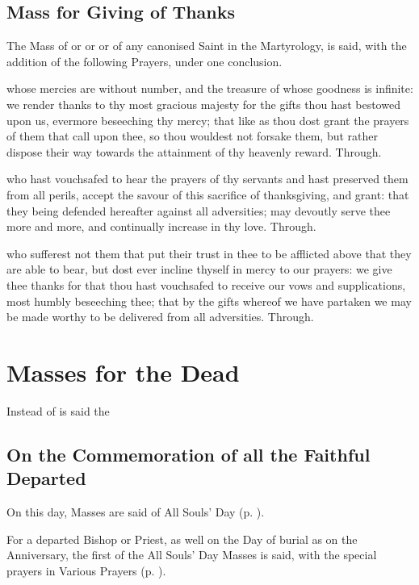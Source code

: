 \clearpage
\subsection{Mass for Giving of Thanks}

\begin{rubric}
	The Mass of  or  or  or of any canonised Saint in the Martyrology, is said, with the addition of the following Prayers, under one conclusion.
\end{rubric}

\collect
{} whose mercies are without number, and the treasure of whose goodness is infinite: we render thanks to thy most gracious majesty for the gifts thou hast bestowed upon us, evermore beseeching thy mercy; that like as thou dost grant the prayers of them that call upon thee, so thou wouldest not forsake them, but rather dispose their way towards the attainment of thy heavenly reward. Through.

\secret
{} who hast vouchsafed to hear the prayers of thy servants and hast preserved them from all perils, accept the savour of this sacrifice of thanksgiving, and grant: that they being defended hereafter against all adversities; may devoutly serve thee more and more, and continually increase in thy love. Through.

\postcommunion
{} who sufferest not them that put their trust in thee to be afflicted above that they are able to bear, but dost ever incline thyself in mercy to our prayers: we give thee thanks for that thou hast vouchsafed to receive our vows and supplications, most humbly beseeching thee; that by the gifts whereof we have partaken we may be made worthy to be delivered from all adversities. Through.


\clearpage
\section{Masses for the Dead}\label{RequiemMasses}
\fancyhead[RE,LO]{}
\begin{secrubric}
    Instead of  is said the 
\end{secrubric}
\vspace{-2ex}
\subsection{On the Commemoration of all the Faithful Departed}
\begin{rubric}
    On this day, Masses are said of All Souls' Day (p. \pageref{AllSouls}).
\end{rubric}
\begin{rubric}
    For a departed Bishop or Priest, as well on the Day of burial as on the Anniversary, the first of the All Souls' Day Masses is said, with the special prayers in Various Prayers (p. \pageref{RequiemPrayers}).
\end{rubric}
